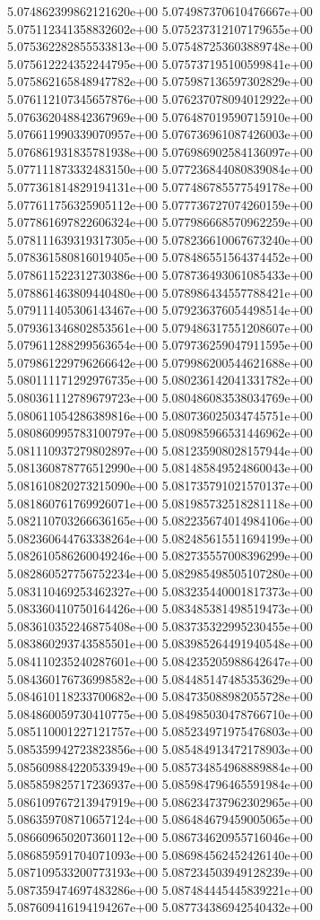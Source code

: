 5.074862399862121620e+00
5.074987370610476667e+00
5.075112341358832602e+00
5.075237312107179655e+00
5.075362282855533813e+00
5.075487253603889748e+00
5.075612224352244795e+00
5.075737195100599841e+00
5.075862165848947782e+00
5.075987136597302829e+00
5.076112107345657876e+00
5.076237078094012922e+00
5.076362048842367969e+00
5.076487019590715910e+00
5.076611990339070957e+00
5.076736961087426003e+00
5.076861931835781938e+00
5.076986902584136097e+00
5.077111873332483150e+00
5.077236844080839084e+00
5.077361814829194131e+00
5.077486785577549178e+00
5.077611756325905112e+00
5.077736727074260159e+00
5.077861697822606324e+00
5.077986668570962259e+00
5.078111639319317305e+00
5.078236610067673240e+00
5.078361580816019405e+00
5.078486551564374452e+00
5.078611522312730386e+00
5.078736493061085433e+00
5.078861463809440480e+00
5.078986434557788421e+00
5.079111405306143467e+00
5.079236376054498514e+00
5.079361346802853561e+00
5.079486317551208607e+00
5.079611288299563654e+00
5.079736259047911595e+00
5.079861229796266642e+00
5.079986200544621688e+00
5.080111171292976735e+00
5.080236142041331782e+00
5.080361112789679723e+00
5.080486083538034769e+00
5.080611054286389816e+00
5.080736025034745751e+00
5.080860995783100797e+00
5.080985966531446962e+00
5.081110937279802897e+00
5.081235908028157944e+00
5.081360878776512990e+00
5.081485849524860043e+00
5.081610820273215090e+00
5.081735791021570137e+00
5.081860761769926071e+00
5.081985732518281118e+00
5.082110703266636165e+00
5.082235674014984106e+00
5.082360644763338264e+00
5.082485615511694199e+00
5.082610586260049246e+00
5.082735557008396299e+00
5.082860527756752234e+00
5.082985498505107280e+00
5.083110469253462327e+00
5.083235440001817373e+00
5.083360410750164426e+00
5.083485381498519473e+00
5.083610352246875408e+00
5.083735322995230455e+00
5.083860293743585501e+00
5.083985264491940548e+00
5.084110235240287601e+00
5.084235205988642647e+00
5.084360176736998582e+00
5.084485147485353629e+00
5.084610118233700682e+00
5.084735088982055728e+00
5.084860059730410775e+00
5.084985030478766710e+00
5.085110001227121757e+00
5.085234971975476803e+00
5.085359942723823856e+00
5.085484913472178903e+00
5.085609884220533949e+00
5.085734854968889884e+00
5.085859825717236937e+00
5.085984796465591984e+00
5.086109767213947919e+00
5.086234737962302965e+00
5.086359708710657124e+00
5.086484679459005065e+00
5.086609650207360112e+00
5.086734620955716046e+00
5.086859591704071093e+00
5.086984562452426140e+00
5.087109533200773193e+00
5.087234503949128239e+00
5.087359474697483286e+00
5.087484445445839221e+00
5.087609416194194267e+00
5.087734386942540432e+00
